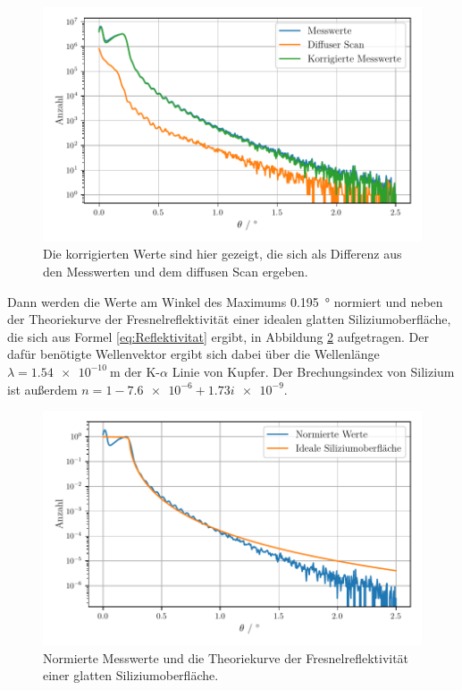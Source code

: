 \begin{figure}
    \centering
    \includegraphics[width=\textwidth]{figures/messwerte_relativ.pdf}
    \caption{Die korrigierten Werte sind hier gezeigt, die sich als Differenz aus den Messwerten und dem diffusen Scan ergeben.}
    \label{abb:diffus}
\end{figure}

Dann werden die Werte am Winkel des Maximums \SI{0.195}{\degree} normiert und neben der Theoriekurve der Fresnelreflektivität einer idealen glatten Siliziumoberfläche, die sich aus Formel \ref{eq:Reflektivitat} ergibt, in Abbildung \ref{abb:norm} aufgetragen. Der dafür benötigte Wellenvektor ergibt sich dabei über die Wellenlänge $\lambda = \SI{1.54e-10}{\meter}$ der K-$\alpha$ Linie von Kupfer. 
Der Brechungsindex von Silizium ist außerdem $n = \num{1} - \num{7.6e-6} + \num{1.73i e-9}$.
\begin{figure}
    \centering
    \includegraphics[width=\textwidth]{figures/messwerte_norm.pdf}
    \caption{Normierte Messwerte und die Theoriekurve der Fresnelreflektivität einer glatten Siliziumoberfläche.}
    \label{abb:norm}
\end{figure}

